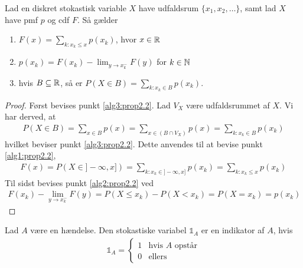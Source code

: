 \begin{prop}%
Lad en diskret stokastisk variable $X$ have udfaldsrum $\{x_1, x_2, \ldots\}$, samt lad $X$ have pmf $p$ og cdf $F$. Så gælder
\begin{enumerate}
    \item $F(x)=\displaystyle \sum_{k:x_k \leq x} p(x_k)$, hvor $x\in \mathbb{R}$ \label{alg1:prop2.2}
    \item $p(x_k)=F(x_k)- \displaystyle \lim_{y \rightarrow x_k^- } F(y)$ for $k\in \mathbb{N} $ \label{alg2:prop2.2}
    \item hvis $B \subseteq \mathbb{R}$, så er $P(X \in B)= \displaystyle \sum_{k:x_k \in B} p(x_k)$. \label{alg3:prop2.2}
\end{enumerate}
\end{prop} 
\begin{proof}
Først bevises punkt \ref{alg3:prop2.2}. Lad $V_X$ være udfaldsrummet af $X$. Vi har derved, at
\begin{align*}
    P(X\in B)=\sum_{x\in B}p(x)=\sum_{x\in(B\cap V_X)}p(x)=\sum_{k:x_k\in B}p(x_k)
\end{align*}
hvilket beviser punkt \ref{alg3:prop2.2}. Dette anvendes til at bevise punkt \ref{alg1:prop2.2},
\begin{align*}
    F(x)=P(X\in]-\infty,x])=\sum_{k:x_k\in ]-\infty,x]}p(x_k)=\sum_{k:x_k\leq x}p(x_k)
\end{align*}
Til sidst bevises punkt \ref{alg2:prop2.2} ved
\begin{align*}
    F(x_k)-\lim_{y\rightarrow x_k^-}F(y)=P(X\leq x_k)-P(X<x_k)=P(X=x_k)=p(x_k)
\end{align*}
\end{proof}


\begin{defn} [Indikator] %
    Lad $A$ være en hændelse. Den stokastiske variabel $\mathbb{1}_A$ er en indikator af $A$, hvis
    \begin{align*}
        \mathbb{1}_A=\begin{cases} 
          1 & \text{hvis } A \text{ opstår} \\
          0 & \text{ellers}
       \end{cases}
    \end{align*}
    \end{defn}
    